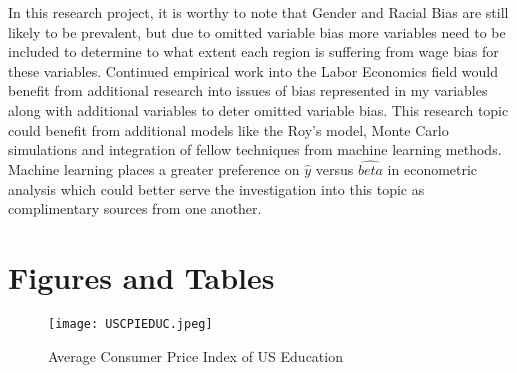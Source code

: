 \documentclass[12pt, English]{article}
\begin{document}
In this research project, it is worthy to note that Gender and Racial Bias are still likely to be prevalent, but due to omitted variable bias more variables need to be included to determine to what extent each region is suffering from wage bias for these variables. Continued empirical work into the Labor Economics field would benefit from additional research into issues of bias represented in my variables along with additional variables to deter omitted variable bias. This research topic could benefit from additional models like the Roy's model, Monte Carlo simulations and integration of fellow techniques from machine learning methods. Machine learning places a greater preference on \begin{math} \hat{y} \end{math} versus \begin{math} \hat{beta} \end{math} in econometric analysis which could better serve the investigation into this topic as complimentary sources from one another. 

\newpage





\newpage

\section*{Figures and Tables}
\begin{figure}[h!]
\centering
\texttt{[image: USCPIEDUC.jpeg]}
\caption{Average Consumer Price Index of US Education}
\label{fig:Figure 1}
\end{figure}



\newpage
\end{document}
